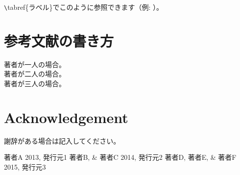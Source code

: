 \documentclass[a4paper,10pt,oneside,twocolumn,notitlepage,final]{jarticle}
\begin{document}
\verb+\+tabref\{ラベル\}でこのように参照できます（例: ）。

\section{参考文献の書き方}
\noindent
著者が一人の場合\citep{ラベル1}。\\
著者が二人の場合\citep{ラベル2}。\\
著者が三人の場合\citep{ラベル3}。\\
\section*{Acknowledgement}
謝辞がある場合は記入してください。

\small
\begin{thebibliography}{99}
 著者A 2013, 発行元1
 著者B, \& 著者C 2014,  発行元2
 著者D, 著者E, \& 著者F 2015, 発行元3
 
 
\end{thebibliography}
\end{document}
